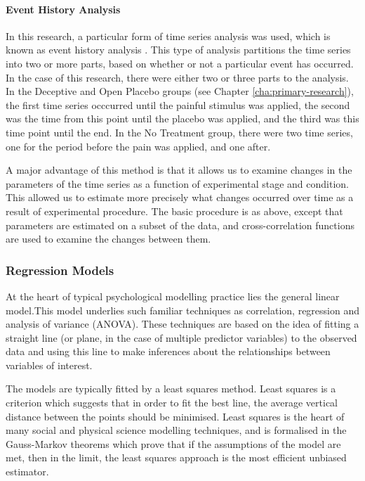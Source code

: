 \paragraph{Event History Analysis}
\label{sec:event-hist-analys}
In this research, a particular form of time series analysis was used, which is known as event history analysis \cite{mccleary1980applied}. This type of analysis partitions the time series into two or more parts, based on whether or not a particular event has occurred. In the case of this research, there were either two or three parts to the analysis. In the Deceptive and Open Placebo groups (see Chapter \ref{cha:primary-research}), the first time series occcurred until the painful stimulus was applied, the second was the time from this point until the placebo was applied, and the third was this time point until the end. In the No Treatment group, there were two time series, one for the period before the pain was applied, and one after.

A major advantage of this method is that it allows us to examine changes in the parameters of the time series as a function of experimental stage and condition. This allowed us to estimate more precisely what changes occurred over time as a result of experimental procedure. The basic procedure is as above, except that parameters are estimated on a subset of the data, and cross-correlation functions are used to examine the changes between them.


\subsubsection{Regression Models}
\label{sec:regress-models}

At the heart of typical psychological modelling practice lies the general linear model.This model underlies such familiar techniques as correlation, regression and analysis of variance (ANOVA)\cite{gelman2007data }. These techniques are based on the idea of fitting a straight line (or plane, in the case of multiple predictor variables) to the observed data and using this line to make inferences about the relationships between variables of interest.

The models are typically fitted by a least squares method. Least squares is a criterion which suggests that in order to fit the best line, the average vertical distance between the points should be minimised. Least squares is the heart of many social and physical science modelling techniques, and is formalised in the Gauss-Markov theorems which prove that if the assumptions of the model are met, then in the limit, the least squares approach is the most efficient unbiased estimator\cite{friedman2009elements}.

